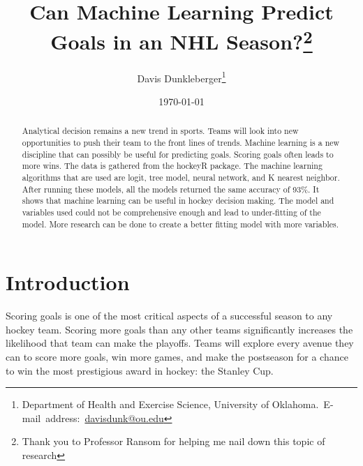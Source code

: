 \documentclass[12pt,english]{article}
\begin{document}
\begin{singlespace}
\title{Can Machine Learning Predict Goals in an NHL Season?\thanks{Thank you to Professor Ransom for helping me nail down this topic of research}}
\end{singlespace}

\author{Davis Dunkleberger\thanks{Department of Health and Exercise Science, University of Oklahoma.\
E-mail~address:~\href{mailto:student.name@ou.edu}{davisdunk@ou.edu}}}

\date{\today}

\maketitle

\begin{abstract}
\begin{singlespace}

Analytical decision remains a new trend in sports. Teams will look into new opportunities to push their team to the front lines of trends. Machine learning is a new discipline that can possibly be useful for predicting goals. Scoring goals often leads to more wins. The data is gathered from the hockeyR package. The machine learning algorithms that are used are logit, tree model, neural network, and K nearest neighbor. After running these models, all the models returned the same accuracy of 93\%. It shows that machine learning can be useful in hockey decision making. The model and variables used could not be comprehensive enough and lead to under-fitting of the model. More research can be done to create a better fitting model with more variables. 

\end{singlespace}

\end{abstract}
\vfill{}


\pagebreak{}


\section{Introduction}\label{sec:intro}
Scoring goals is one of the most critical aspects of a successful season to any hockey team. Scoring more goals than any other teams significantly increases the likelihood that team can make the playoffs. Teams will explore every avenue they can to score more goals, win more games, and make the postseason for a chance to win the most prestigious award in hockey: the Stanley Cup.
\end{document}
